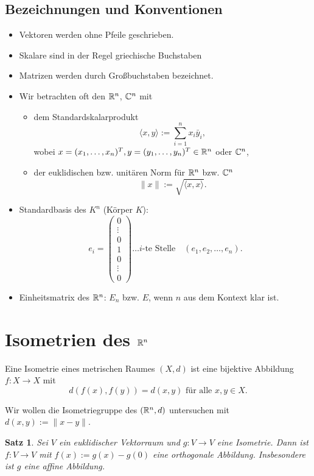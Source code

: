 \documentclass[
 a4paper,
 12pt,
 parskip=half
 ]{scrartcl}
\theoremstyle{plain}
\newtheorem{thm}{Satz}[section] %
\theoremstyle{definition}
\numberwithin{equation}{section}
\begin{document}
\subsection{Bezeichnungen und Konventionen}
\begin{itemize}
 \item Vektoren werden ohne Pfeile geschrieben.
 \item Skalare sind in der Regel griechische Buchstaben
 \item Matrizen werden durch Großbuchstaben bezeichnet.
 \item Wir betrachten oft den $\mathbb{R}^n$, $\mathbb{C}^n$ mit 
  \begin{itemize}
   \item dem Standardskalarprodukt
    \[ \langle x, y \rangle := \sum_{i=1}^n x_i \bar{y}_i, \]
    wobei $x = (x_1, \ldots, x_n)^T, y = (y_1, \ldots, y_n)^T \in \mathbb{R}^n$ oder $\mathbb{C}^n$, 
   \item der euklidischen bzw. unitären Norm für $\mathbb{R}^n$ bzw. $\mathbb{C}^n$
    \[ \| x \| := \sqrt{ \langle x,x \rangle }. \]
  \end{itemize}
 \item Standardbasis des $K^n$ (Körper $K$):
  \[ e_i = \begin{pmatrix} 0 \\ \vdots \\ 0 \\ 1 \\ 0 \\ \vdots \\ 0 \end{pmatrix} \ldots i\text{-te Stelle} \quad (e_1, e_2, \ldots, e_n). \]
 \item Einheitsmatrix des $\mathbb{R}^n$: $E_n$ bzw. $E$, wenn $n$ aus dem Kontext klar ist.
\end{itemize}

\setcounter{secnumdepth}{1}
\section{Isometrien des \texorpdfstring{$\mathbb{R}^n$}{Rn}}
Eine Isometrie eines metrischen Raumes $(X, d)$ ist eine bijektive Abbildung $f: X \to X$ mit
\[ d( f(x), f(y) ) = d(x,y) \text{ für alle } x, y \in X. \]

Wir wollen die Isometriegruppe des $(\mathbb{R}^n, d)$ untersuchen mit $d(x,y) := \| x - y \|$.

\begin{thm}
 Sei $V$ ein euklidischer Vektorraum und $g: V \to V$ eine Isometrie. Dann ist $f: V \to V$ mit $f(x) := g(x) - g(0)$ eine orthogonale Abbildung. Insbesondere ist $g$ eine affine Abbildung.
\end{thm}
\end{document}
